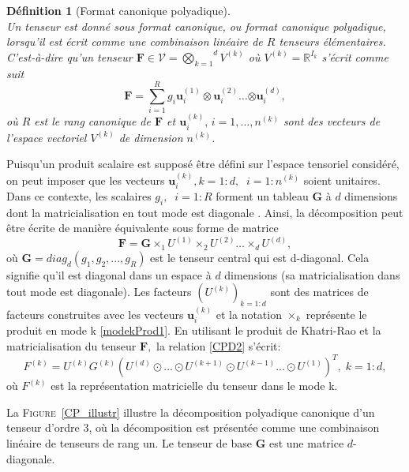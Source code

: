 \documentclass[11pt,a4paper,oneside]{book}
\newtheorem{defi}{Définition}[chapter]
\def\gktensor{\overset{d}{\underset{k=1}{\bigotimes}}}
\newcommand{\mbf}[1]{\mathbf{#1}}
\newcommand{\figref}[1]{\textsc{Figure}~\ref{#1}}
\begin{document}
\begin{defi}[Format canonique polyadique]
\emph{\\}
Un tenseur est donné sous format canonique, ou format canonique polyadique, lorsqu'il est écrit comme une combinaison linéaire de $ R $ tenseurs élémentaires. C'est-à-dire qu'un tenseur $\mathbf{F} \in \mathcal{V} = \gktensor V^{(k)}$ où $ V^{(k)} = \mathbb{R}^{I_k}$ s'écrit comme suit
\begin{equation}
\label{CPD1}
\mathbf{F}=\sum_{i=1}^{R}g_i{\mathbf{u}_i^{(1)}\otimes{\mathbf{u}_i^{(2)}}
	\ldots{\otimes{\mathbf{u}_i^{(d)}}}},
\end{equation}
où $ R $ est le rang canonique de $\mathbf{F}$ et $\mathbf{u}_i^{(k)},\,i = 1,\ldots,n^{(k)}$ sont des vecteurs de l'espace vectoriel $ V^{(k)}$ de dimension $n^{(k)}$.
\end{defi}
 Puisqu'un produit scalaire est supposé être défini sur l'espace tensoriel considéré, on peut imposer que les vecteurs $\mathbf{u}_i^{(k)},k = 1:d,\;\;i = 1:n^{(k)}$ soient unitaires. Dans ce contexte, les scalaires $g_i,\;\;i = 1:R$ forment un tableau $\mathbf{G}$ à $ d $ dimensions dont la matricialisation en tout mode est diagonale \cite[p.137]{Nyenyezi2018}. Ainsi, la décomposition peut être écrite de manière équivalente sous forme de matrice
\begin{equation}
\label{CPD2}
\mathbf{F}=\mathbf{G}\times_1{U^{(1)}\times_2{U^{(2)}}\ldots{\times_d{U^{(d)}}}},
\end{equation}
où $\mathbf{G}=diag_d(g_1,g_2,...,g_R)$ est le tenseur central qui est d-diagonal. Cela signifie qu'il est diagonal dans un espace à $ d $ dimensions (sa matricialisation dans tout mode est diagonale). Les facteurs $(U^{(k)})_{k=1:d}$ sont des matrices de facteurs construites avec les vecteurs $\mathbf{u}_i^{(k)}$ et la notation $\times_k$ représente le produit en mode k \eqref{modekProd1}. En utilisant le produit de Khatri-Rao et la matricialisation du tenseur $\mathbf{F},$ la relation \eqref{CPD2} s'écrit:
\begin{equation}
F^{(k)}=U^{(k)}{G^{(k)}}(U^{(d)}\odot...\odot{U^{(k+1)}}\odot{U^{(k-1)}}...\odot{U^{(1)}})^T,\; k=1:d,
\end{equation}
où $F^{(k)}$ est la représentation matricielle du tenseur dans le mode k.

La \figref{CP_illustr} illustre la décomposition polyadique canonique d'un tenseur d'ordre 3, où la décomposition est présentée comme une combinaison linéaire de tenseurs de rang un. Le tenseur de base $\mbf{G}$ est une matrice $  d $-diagonale.\\
\end{document}
